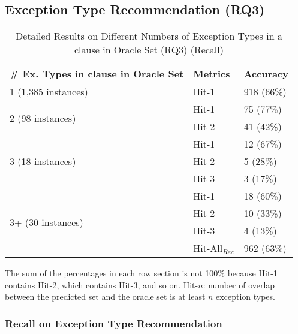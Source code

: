 \subsection{Exception Type Recommendation (RQ3)}
\label{sec:rq3}

\begin{table}[t]
  \caption{Detailed Results on Different Numbers of Exception Types in a
     clause in Oracle Set (RQ3) (Recall)}
  \vspace{-12pt}
	{\small
	  \begin{center}
            \tabcolsep 3.5pt
			\renewcommand{\arraystretch}{1}
			\begin{tabular}{p{4.5cm}<{\centering}|p{1.3cm}<{\centering}|p{1.5cm}<{\centering}}
				\hline
				\# Ex. Types in \code{catch} clause in Oracle Set & Metrics &  Accuracy\\
				\hline
				\multirow{1}{*}{1 (1,385 instances)}   & Hit-1  & 918 (66\%) \\
				\hline
				\multirow{2}{*}{2 (98 instances)}  & Hit-1   & 75 (77\%) \\
				& Hit-2         &  41 (42\%) \\
				\hline
				\multirow{3}{*}{3 (18 instances)}  & Hit-1    & 12 (67\%) \\
				& Hit-2     & 5 (28\%)\\
				& Hit-3     & 3 (17\%) \\
				\hline
				\multirow{4}{*}{3+ (30 instances)}  & Hit-1   & 18 (60\%) \\
				& Hit-2     & 10 (33\%) \\
				& Hit-3     & 4 (13\%)\\
                                \hline
                                & Hit-All$_{Rec}$ & 962 (63\%)\\
				\hline
			\end{tabular}
	                The sum of the percentages in each row section is not 100\% because Hit-1 contains Hit-2, which contains Hit-3, and so on. Hit-$n$: number of overlap between the predicted set and the oracle set is at least $n$ exception types.
			\label{tab:recall-3}
		\end{center}
	}
\end{table}

\subsubsection{{\bf Recall on Exception Type Recommendation}}
\label{sec:req3-recall}

